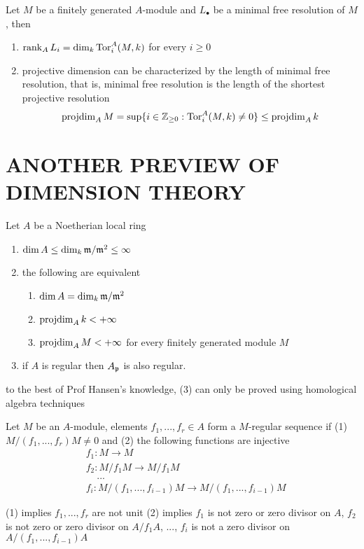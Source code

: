 \begin{proposition}
	Let $M$ be a finitely generated $A$-module and $L_\bullet$ be a minimal free resolution of $M$, then
	\begin{enumerate}
		\item $\operatorname{rank}_A L_i = \dim_k \operatorname{Tor}_i^A(M, k)$ for every $i \geq 0$
		\item projective dimension can be characterized by the length of minimal free resolution, that is, minimal free resolution is the length of the shortest projective resolution
		$$
			\operatorname{projdim}_A M = \sup\{i \in \mathbb{Z}_{\geq 0}: \operatorname{Tor}_i^A(M, k) \neq 0\} \leq \operatorname{projdim}_A k
		$$
	\end{enumerate}
\end{proposition}

\section{ANOTHER PREVIEW OF DIMENSION THEORY}


\begin{remark}
	Let $A$ be a Noetherian local ring
	\begin{enumerate}
		\item $\dim A \leq \dim_k \mathfrak{m} / \mathfrak{m}^2 \leq \infty$
		\item the following are equivalent
		\begin{enumerate}
			\item $\dim A = \dim_k \mathfrak{m} / \mathfrak{m}^2$
			\item $\operatorname{projdim}_A k < +\infty$
			\item $\operatorname{projdim}_A M < + \infty$ for every finitely generated module $M$
		\end{enumerate}
		\item if $A$ is regular then $A_{\mathfrak{p}}$ is also regular.
	\end{enumerate}
	
	to the best of Prof Hansen's knowledge, (3) can only be proved using homological algebra techniques
\end{remark}

\begin{definition}
	Let $M$ be an $A$-module, elements $f_1, ..., f_r \in A$ form a $M$-regular sequence if (1) $M / (f_1, ..., f_r) M \neq 0$ and (2) the following functions are injective
	\begin{align*}
		&f_1: M \to M \\
		&f_2: M / f_1 M \to M / f_1 M \\
		&\;\;\;\;... \\
		&f_i: M / (f_1, ..., f_{i-1}) M \to M / (f_1, ..., f_{i-1}) M
	\end{align*}
	
	(1) implies $f_1, ..., f_r$ are not unit (2) implies $f_1$ is not zero or zero divisor on $A$, $f_2$ is not zero or zero divisor on $A / f_1 A$, ..., $f_i$ is not a zero divisor on $A / (f_1, ..., f_{i-1}) A$
\end{definition}

